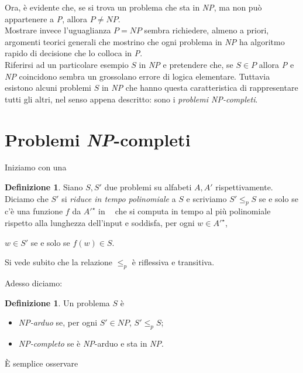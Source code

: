 \documentclass[12pt,a4paper]{report}
\theoremstyle{definition}
\newtheorem{defn}[teo]{Definizione}  %
\DeclareMathOperator{\aaa}{\textit{A}^{\star}}
\begin{document}
Ora, è evidente che, se si trova un problema che sta in \emph{NP}, ma non può appartenere a \emph{P}, allora $P \neq NP$.\\
Mostrare invece l'uguaglianza $P=NP$ sembra richiedere, almeno a priori, argomenti teorici generali che mostrino che ogni problema in \emph{NP} ha algoritmo rapido di decisione che lo colloca in \emph{P}.\\
Riferirsi ad un particolare esempio $S$ in \emph{NP} e pretendere che, se $S \in P$ allora \emph{P} e \emph{NP} coincidono sembra un grossolano errore di logica elementare. Tuttavia esistono alcuni problemi $S$ in \emph{NP} che hanno questa caratteristica di rappresentare tutti gli altri, nel senso appena descritto: sono i \emph{problemi NP-completi}.


\section{Problemi \emph{NP}-completi}

Iniziamo con una

\begin{defn}\label{def_riduzione}
Siano $S, S'$ due problemi su alfabeti $A, A'$ rispettivamente. Diciamo che $S'$ si \emph{riduce in tempo polinomiale} a $S$ e scriviamo $S' \leq_p S$ se e solo se c'è una funzione $f$ da $A'^{\star}$ in $\aaa$ che si computa in tempo al più polinomiale rispetto alla lunghezza dell'input e soddisfa, per ogni $w \in A'^{\star}$,\\
\centerline{$w \in S'$ se e solo se $f(w) \in S$.}
Si vede subito che la relazione $\leq_p$ è riflessiva e transitiva. 
\end{defn}

Adesso diciamo:

\begin{defn}
Un problema $S$ è
\begin{itemize}
\item \emph{NP-arduo} se, per ogni $S' \in NP$, $S' \leq_p S$;
\item \emph{NP-completo} se è \emph{NP}-arduo e sta in \emph{NP}.
\end{itemize}
\end{defn}

È semplice osservare
\end{document}
